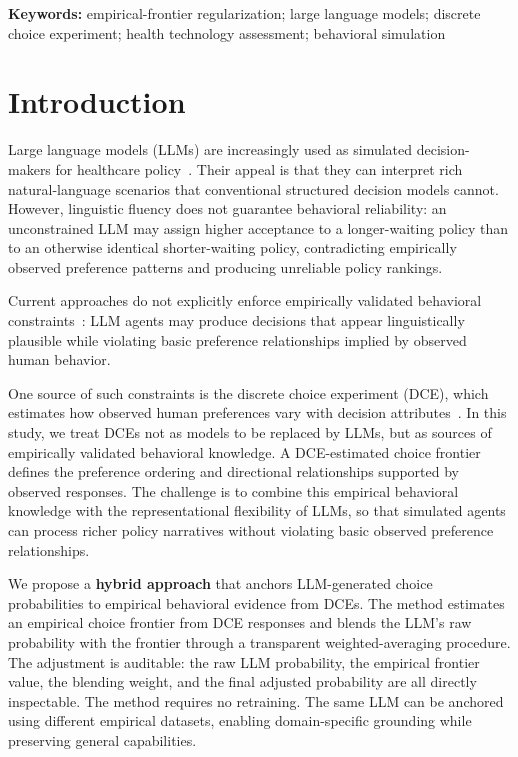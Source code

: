 \documentclass[11pt]{article}
\newcommand{\keywords}[1]{\vspace{0.5em}\noindent\textbf{Keywords:} #1}
\begin{document}
\keywords{empirical-frontier regularization; large language models; discrete choice experiment; health technology assessment; behavioral simulation}

\clearpage
\section{Introduction}
\label{sec:intro}

Large language models (LLMs) are increasingly used as simulated decision-makers for healthcare policy~\citep{Park2023a, Mu2024, VonHoene2025}. Their appeal is that they can interpret rich natural-language scenarios that conventional structured decision models cannot. However, linguistic fluency does not guarantee behavioral reliability: an unconstrained LLM may assign higher acceptance to a longer-waiting policy than to an otherwise identical shorter-waiting policy, contradicting empirically observed preference patterns and producing unreliable policy rankings.

Current approaches do not explicitly enforce empirically validated behavioral constraints~\citep{Aher2022TuringExperiments, Horton2023, santurkar2023whose}: LLM agents may produce decisions that appear linguistically plausible while violating basic preference relationships implied by observed human behavior.

One source of such constraints is the discrete choice experiment (DCE), which estimates how observed human preferences vary with decision attributes~\citep{Chan2024}. In this study, we treat DCEs not as models to be replaced by LLMs, but as sources of empirically validated behavioral knowledge. A DCE-estimated choice frontier defines the preference ordering and directional relationships supported by observed responses. The challenge is to combine this empirical behavioral knowledge with the representational flexibility of LLMs, so that simulated agents can process richer policy narratives without violating basic observed preference relationships.

We propose a \textbf{hybrid approach} that anchors LLM-generated choice probabilities to empirical behavioral evidence from DCEs. The method estimates an empirical choice frontier from DCE responses and blends the LLM's raw probability with the frontier through a transparent weighted-averaging procedure. The adjustment is auditable: the raw LLM probability, the empirical frontier value, the blending weight, and the final adjusted probability are all directly inspectable. The method requires no retraining. The same LLM can be anchored using different empirical datasets, enabling domain-specific grounding while preserving general capabilities.
\end{document}
